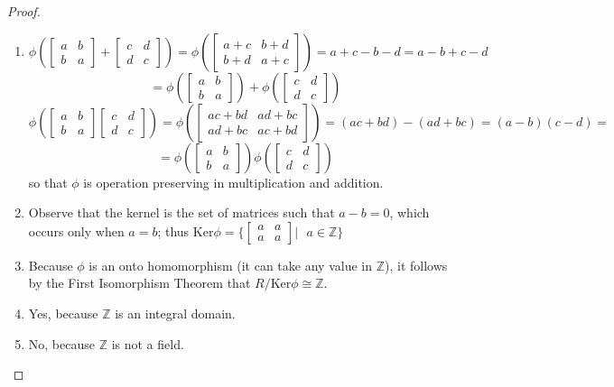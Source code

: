 \documentclass{article}
\begin{document}
\begin{proof}
\begin{enumerate}[label = (\alph*)]
    \item \[ \phi\left( \begin{bmatrix} a & b \\ b & a \end{bmatrix} + \begin{bmatrix} c & d \\ d & c \end{bmatrix}\right) = \phi\left( \begin{bmatrix} a+c & b+d \\ b+d & a+c \end{bmatrix}\right) = a + c - b - d = a - b + c - d\] 
    \[= \phi\left( \begin{bmatrix} a & b \\ b & a \end{bmatrix}\right) + \phi\left( \begin{bmatrix} c & d \\ d & c \end{bmatrix}\right)\]
    \[ \phi\left( \begin{bmatrix} a & b \\ b & a \end{bmatrix} \begin{bmatrix} c & d \\ d & c \end{bmatrix}\right) = \phi\left( \begin{bmatrix} ac + bd & ad + bc \\ ad + bc & ac + bd \end{bmatrix}\right) = (ac + bd) - (ad + bc) = (a-b)(c-d) = \] 
    \[= \phi\left( \begin{bmatrix} a & b \\ b & a \end{bmatrix}\right)\phi\left( \begin{bmatrix} c & d \\ d & c \end{bmatrix}\right)\]
    so that $\phi$ is operation preserving in multiplication and addition.
    \item Observe that the kernel is the set of matrices such that $a - b = 0$, which occurs only when $a = b$; thus Ker$\phi = \bigg\{ \begin{bmatrix} a & a \\ a & a \end{bmatrix} \bigg| \text{ } a \in \mathbb{Z}\bigg\}$
    \item Because $\phi$ is an onto homomorphism (it can take any value in $\mathbb{Z}$), it follows by the First Isomorphism Theorem that $R/\text{Ker} \phi \cong \mathbb{Z}$.
    \item Yes, because $\mathbb{Z}$ is an integral domain.
    \item No, because $\mathbb{Z}$ is not a field.
\end{enumerate}


\end{proof}
\end{document}

